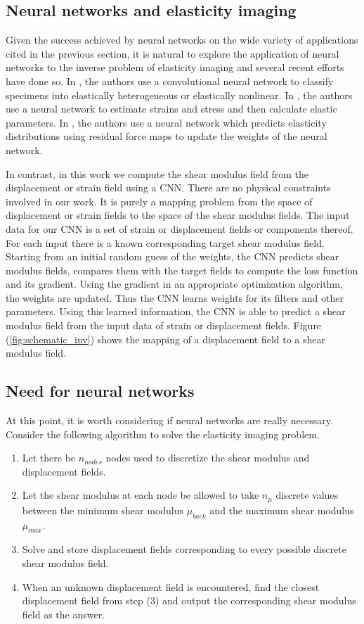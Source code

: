 \documentclass[12pt]{article}
\begin{document}
\subsection{Neural networks and elasticity imaging}
Given the success achieved by neural networks on the wide variety of applications cited in the previous section, it is natural to explore the application of neural networks to the inverse problem of elasticity imaging and several recent efforts \cite{paper:pateloberai2019,misc:gu2020,paper:hoeriginsana2016} have done so. In \cite{paper:pateloberai2019}, the authors use a convolutional neural network to classify specimens into elastically heterogeneous or elastically nonlinear. In \cite{paper:hoeriginsana2016}, the authors use a neural network to estimate strains and stress and then calculate elastic parameters. In \cite{misc:gu2020}, the authors use a neural network which predicts elasticity distributions using residual force maps to update the weights of the neural network.

In contrast, in this work we compute the shear modulus field from the displacement or strain field using a CNN. There are no physical constraints involved in our work. It is purely a mapping problem from the space of displacement or strain fields to the space of the shear modulus fields. The input data for our CNN is a set of strain or displacement fields or components thereof. For each input there is a known corresponding target shear modulus field. Starting from an initial random guess of the weights, the CNN predicts shear modulus fields, compares them with the target fields to compute the loss function and its gradient. Using the gradient in an appropriate optimization algorithm, the weights are updated. Thus the CNN learns weights for its filters and other parameters. Using this learned information, the CNN is able to predict a shear modulus field from the input data of strain or displacement fields. Figure (\ref{fig:schematic_inv}) shows the mapping of a displacement field to a shear modulus field.\\
\subsection{Need for neural networks}
At this point, it is worth considering if neural networks are really necessary. Consider the following algorithm to solve the elasticity imaging problem.
%
\begin{enumerate}
\item{Let there be $n_{nodes}$ nodes used to discretize the shear modulus and displacement fields.}
\item{Let the shear modulus at each node be allowed to take $n_{\mu}$ discrete values between the minimum shear modulus $\mu_{back}$ and the maximum shear modulus $\mu_{max}$.}
\item{Solve and store displacement fields corresponding to every possible discrete shear modulus field.}
\item{When an unknown displacement field is encountered, find the closest displacement field from step (3) and output the corresponding shear modulus field as the answer.}
\end{enumerate}
\end{document}
